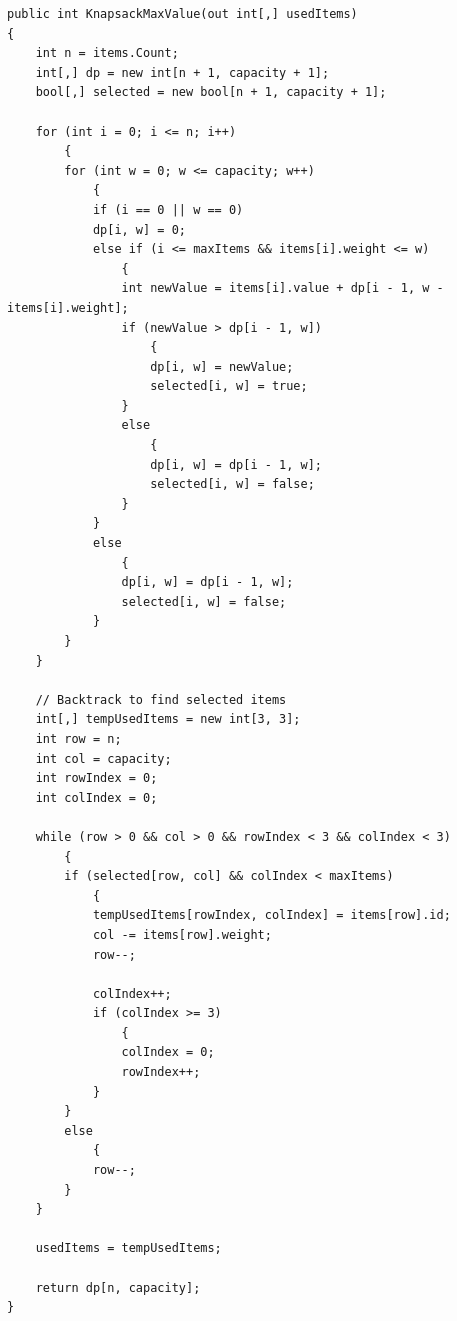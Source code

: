 \begin{lstlisting}[style=csharp, caption={Knapsack Algorithmus / Item Backtracking}, label=code:startKnapsack]
public int KnapsackMaxValue(out int[,] usedItems)
{
    int n = items.Count;
    int[,] dp = new int[n + 1, capacity + 1];
    bool[,] selected = new bool[n + 1, capacity + 1];

    for (int i = 0; i <= n; i++)
        {
        for (int w = 0; w <= capacity; w++)
            {
            if (i == 0 || w == 0)
            dp[i, w] = 0;
            else if (i <= maxItems && items[i].weight <= w)
                {
                int newValue = items[i].value + dp[i - 1, w - items[i].weight];
                if (newValue > dp[i - 1, w])
                    {
                    dp[i, w] = newValue;
                    selected[i, w] = true;
                }
                else
                    {
                    dp[i, w] = dp[i - 1, w];
                    selected[i, w] = false;
                }
            }
            else
                {
                dp[i, w] = dp[i - 1, w];
                selected[i, w] = false;
            }
        }
    }

    // Backtrack to find selected items
    int[,] tempUsedItems = new int[3, 3];
    int row = n;
    int col = capacity;
    int rowIndex = 0;
    int colIndex = 0;

    while (row > 0 && col > 0 && rowIndex < 3 && colIndex < 3)
        {
        if (selected[row, col] && colIndex < maxItems)
            {
            tempUsedItems[rowIndex, colIndex] = items[row].id;
            col -= items[row].weight;
            row--;

            colIndex++;
            if (colIndex >= 3)
                {
                colIndex = 0;
                rowIndex++;
            }
        }
        else
            {
            row--;
        }
    }

    usedItems = tempUsedItems;

    return dp[n, capacity];
}
\end{lstlisting}\\
